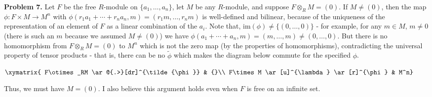 \documentclass[11pt]{article}
\newcommand{\num}[1]{\noindent \textbf{#1}}
\theoremstyle{definition}
\begin{document}
\num{Problem 7.} Let $F$ be the free $R$-module on $\{a_1,\ldots,a_n\}$, let $M$ be any $R$-module, and suppose $F\otimes_R M=(0)$. If $M\neq(0)$, then the map $\phi:F\times M\rightarrow M^n$ with $\phi(r_1a_1+\cdots+r_na_n,m)=(r_1m,\ldots,r_nm)$ is well-defined and bilinear, because of the uniqueness of the representation of an element of $F$ as a linear combination of the $a_i$. Note that,  im$(\phi)\neq\{(0,\ldots,0)\}$ - for example, for any $m\in M$, $m\neq 0$ (there is such an $m$ because we assumed $M\neq(0)$) we have $\phi(a_1+\cdots+a_n,m)=(m,\ldots,m)\neq(0,\ldots,0)$. But there is no homomorphism from $F\otimes_RM=(0)$ to $M^n$ which is not the zero map (by the properties of homomorphisms), contradicting the universal property of tensor products - that is, there can be no $\tilde{\phi}$ which makes the diagram below commute for the specified $\phi$.\\

\begin{center}
$\xymatrix{
F\otimes_RM \ar@{.>}[dr]^{\tilde{\phi}} & {}\\
F\times M \ar[u]^{\lambda} \ar[r]^{\phi} & M^n}$\\
\end{center}   

\noindent Thus, we must have $M=(0)$. I also believe this argument holds even when $F$ is free on an infinite set.
\end{document}
